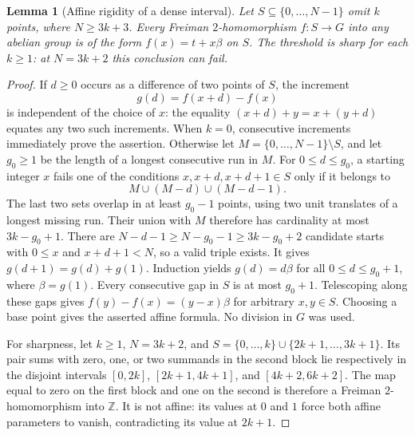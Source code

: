 \documentclass[11pt]{article}
\newtheorem{lemma}[theorem]{Lemma}
\theoremstyle{definition}
\theoremstyle{remark}
\newcommand{\Z}{\mathbb Z}
\begin{document}
\begin{lemma}[Affine rigidity of a dense interval]
\label{lem:dense-interval-affine}
Let $S\subseteq\{0,\ldots,N-1\}$ omit $k$ points, where $N\ge3k+3$.
Every Freiman $2$-homomorphism $f:S\to G$ into any abelian group is
of the form $f(x)=t+x\beta$ on $S$. The threshold is sharp for each
$k\ge1$: at $N=3k+2$ this conclusion can fail.
\end{lemma}
\begin{proof}
If $d\ge0$ occurs as a difference of two points of $S$, the increment
\[
g(d)=f(x+d)-f(x)
\]
is independent of the choice of $x$: the equality
$(x+d)+y=x+(y+d)$ equates any two such increments.
When $k=0$, consecutive increments immediately prove the assertion.
Otherwise let $M=\{0,\ldots,N-1\}\setminus S$, and let $g_0\ge1$
be the length of a longest consecutive run in $M$. For
$0\le d\le g_0$, a starting integer $x$ fails one of the conditions
$x,x+d,x+d+1\in S$ only if it belongs to
\[
M\cup(M-d)\cup(M-d-1).
\]
The last two sets overlap in at least $g_0-1$ points, using two
unit translates of a longest missing run. Their union with $M$
therefore has cardinality at most $3k-g_0+1$.
There are $N-d-1\ge N-g_0-1\ge3k-g_0+2$ candidate starts with
$0\le x$ and $x+d+1<N$, so a valid triple exists.
It gives $g(d+1)=g(d)+g(1)$. Induction yields
$g(d)=d\beta$ for all $0\le d\le g_0+1$, where $\beta=g(1)$.
Every consecutive gap in $S$ is at most $g_0+1$.
Telescoping along these gaps gives
$f(y)-f(x)=(y-x)\beta$ for arbitrary $x,y\in S$.
Choosing a base point gives the asserted affine formula.
No division in $G$ was used.

For sharpness, let $k\ge1$, $N=3k+2$, and
$S=\{0,\ldots,k\}\cup\{2k+1,\ldots,3k+1\}$.
Its pair sums with zero, one, or two summands in the second block
lie respectively in the disjoint intervals
$[0,2k]$, $[2k+1,4k+1]$, and $[4k+2,6k+2]$.
The map equal to zero on the first block and one on the second
is therefore a Freiman $2$-homomorphism into $\Z$.
It is not affine: its values at $0$ and $1$ force both affine
parameters to vanish, contradicting its value at $2k+1$.
\end{proof}
\end{document}
